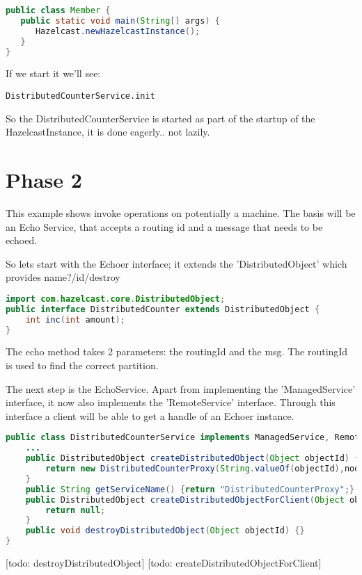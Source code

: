 \begin{lstlisting}[language=java]
public class Member {
   public static void main(String[] args) {
      Hazelcast.newHazelcastInstance();
   }
}
\end{lstlisting}
If we start it we'll see:
\begin{lstlisting}
DistributedCounterService.init
\end{lstlisting}
So the DistributedCounterService is started as part of the startup of the HazelcastInstance, it is done eagerly.. not lazily.

\section{Phase 2}
This example shows invoke operations on potentially a machine. The basis will be an Echo Service, that accepts a routing id and a message that needs to be echoed.

So lets start with the Echoer interface; it extends the 'DistributedObject' which provides name?/id/destroy
\begin{lstlisting}[language=java]
import com.hazelcast.core.DistributedObject;
public interface DistributedCounter extends DistributedObject {
    int inc(int amount);
}
\end{lstlisting}
The echo method takes 2 parameters: the routingId and the msg. The routingId is used to find the correct partition. 

The next step is the EchoService. Apart from implementing the 'ManagedService' interface, it now also implements the 'RemoteService' interface. Through this interface a client will be able to get a handle of an Echoer instance.
\begin{lstlisting}[language=java]
public class DistributedCounterService implements ManagedService, RemoteService {
    ...  
    public DistributedObject createDistributedObject(Object objectId) {
        return new DistributedCounterProxy(String.valueOf(objectId),nodeEngine);
    }
    public String getServiceName() {return "DistributedCounterProxy";}
    public DistributedObject createDistributedObjectForClient(Object objectId) {
        return null;
    }
    public void destroyDistributedObject(Object objectId) {}
}
\end{lstlisting}
[todo: destroyDistributedObject]
[todo: createDistributedObjectForClient]

